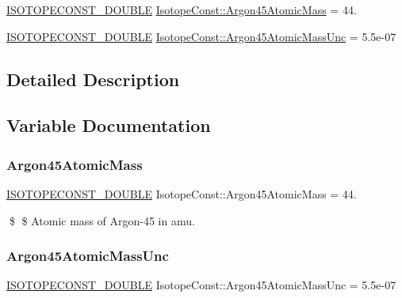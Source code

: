 \begin{DoxyCompactItemize}
\item 
\mbox{\hyperlink{group___isotope_const-_macros_ga8f45a7272ce02c0b4c65c44636ed719a}{I\+S\+O\+T\+O\+P\+E\+C\+O\+N\+S\+T\+\_\+\+D\+O\+U\+B\+LE}} \mbox{\hyperlink{group___isotope_const-_argon-_ar45_ga552189b42fc39faf989b2317164cb23a}{Isotope\+Const\+::\+Argon45\+Atomic\+Mass}} = 44.
\item 
\mbox{\hyperlink{group___isotope_const-_macros_ga8f45a7272ce02c0b4c65c44636ed719a}{I\+S\+O\+T\+O\+P\+E\+C\+O\+N\+S\+T\+\_\+\+D\+O\+U\+B\+LE}} \mbox{\hyperlink{group___isotope_const-_argon-_ar45_ga0a49c92aa531318db14a763b35934635}{Isotope\+Const\+::\+Argon45\+Atomic\+Mass\+Unc}} = 5.\+5e-\/07
\end{DoxyCompactItemize}


\subsection{Detailed Description}


\subsection{Variable Documentation}
\mbox{\label{group___isotope_const-_argon-_ar45_ga552189b42fc39faf989b2317164cb23a}} 
\subsubsection{\texorpdfstring{Argon45\+Atomic\+Mass}{Argon45AtomicMass}}
{\footnotesize\ttfamily \mbox{\hyperlink{group___isotope_const-_macros_ga8f45a7272ce02c0b4c65c44636ed719a}{I\+S\+O\+T\+O\+P\+E\+C\+O\+N\+S\+T\+\_\+\+D\+O\+U\+B\+LE}} Isotope\+Const\+::\+Argon45\+Atomic\+Mass = 44.}

\$ \$ Atomic mass of Argon-\/45 in amu. \mbox{\label{group___isotope_const-_argon-_ar45_ga0a49c92aa531318db14a763b35934635}} 
\subsubsection{\texorpdfstring{Argon45\+Atomic\+Mass\+Unc}{Argon45AtomicMassUnc}}
{\footnotesize\ttfamily \mbox{\hyperlink{group___isotope_const-_macros_ga8f45a7272ce02c0b4c65c44636ed719a}{I\+S\+O\+T\+O\+P\+E\+C\+O\+N\+S\+T\+\_\+\+D\+O\+U\+B\+LE}} Isotope\+Const\+::\+Argon45\+Atomic\+Mass\+Unc = 5.\+5e-\/07}

